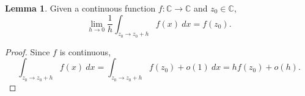 \documentclass{report}
\theoremstyle{definition}
\newtheorem{lemma}{Lemma}
\begin{document}
\begin{lemma}
  \label{derivOfLinint}
  \leanok
  Given a continuous function $f:\mathbb C\to\mathbb C$ and $z_0\in\mathbb C$,
  \begin{equation}
    \lim_{h\to0}\frac1h\int_{z_0\to z_0+h}f(x)\ dx=f(z_0)
    .
  \end{equation}
\end{lemma}

\begin{proof}
  Since $f$ is continuous,
  \begin{equation}
    \int_{z_0\to z_0+h}f(x)\ dx
    =
    \int_{z_0\to z_0+h}f(z_0)+o(1)\ dx
    =
    hf(z_0)+o(h)
    .
  \end{equation}
\end{proof}
\end{document}
